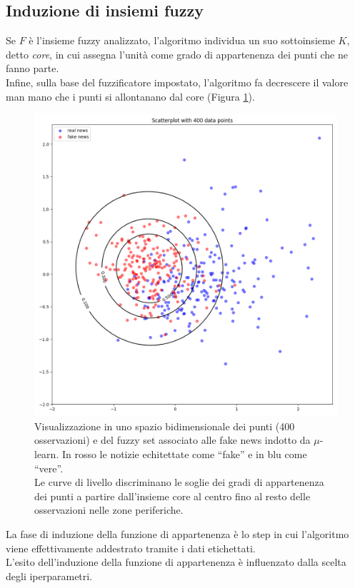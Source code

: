 \documentclass[12pt]{report}
\theoremstyle{definition}
\begin{document}
\subsection{Induzione di insiemi fuzzy}
Se $F$ è l'insieme fuzzy analizzato, l'algoritmo individua un suo sottoinsieme $K$, detto \textit{core}, in cui assegna l'unità come grado di appartenenza dei punti che ne fanno parte.
\\
Infine, sulla base del fuzzificatore impostato, l'algoritmo fa decrescere il valore man mano che i punti si allontanano dal core (Figura \ref{mulearnplot}). 
\begin{figure}
    \centering
    \includegraphics[scale=0.35]{images/mulearn.png}
    \caption{Visualizzazione in uno spazio bidimensionale dei punti (400 osservazioni) e del fuzzy set associato alle fake news indotto da $\mu$-learn. In rosso le notizie echitettate come ``fake'' e in blu come ``vere''.
    \\
    Le curve di livello discriminano le soglie dei gradi di appartenenza dei punti a partire dall'insieme core al centro fino al resto delle osservazioni nelle zone periferiche.}
    \label{mulearnplot}
\end{figure}
La fase di induzione della funzione di appartenenza è lo step in cui l'algoritmo viene effettivamente addestrato tramite i dati etichettati.
\\
L'esito dell'induzione della funzione di appartenenza è influenzato dalla scelta degli iperparametri.
\end{document}
